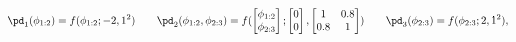 \begin{equation}
  \pd_{1}(\phi_{1:2}) = f(\phi_{1:2}; -2, 1^2) 
  \qquad
  \pd_{2}(\phi_{1:2}, \phi_{2:3}) = f(
    \begin{bmatrix} \phi_{1:2} \\ \phi_{2:3}\end{bmatrix};
    \begin{bmatrix} 0 \\ 0 \end{bmatrix},
    \begin{bmatrix} 1 & 0.8 \\ 0.8 & 1 \end{bmatrix}
  )
  \qquad
  \pd_{3}(\phi_{2:3}) = f(\phi_{2:3}; 2, 1^2),
  \label{eqn:marginal-gaussian-example}
\end{equation}